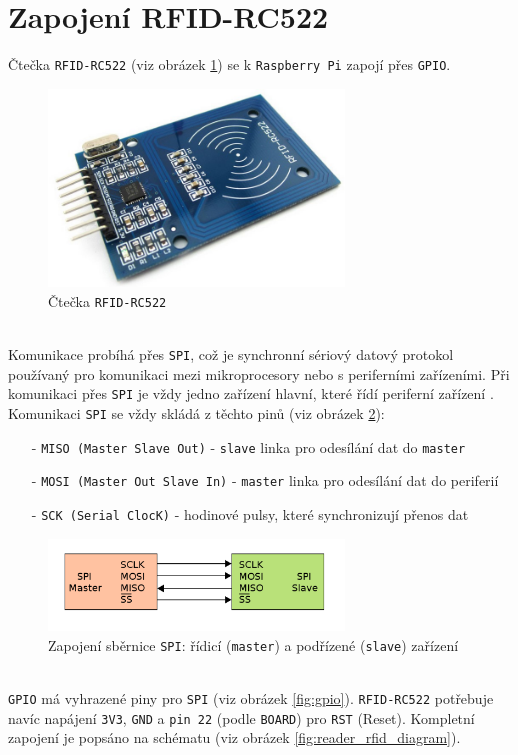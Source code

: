 \documentclass[czech,BP]{thesiskiv}
\begin{document}
		\section{Zapojení RFID-RC522}
Čtečka \texttt{RFID-RC522} (viz obrázek \ref{fig:rfid_rc522}) se k \texttt{Raspberry Pi} zapojí přes \texttt{GPIO}. 
\begin{figure}[H]
		\centering
		\includegraphics[width=0.7\textwidth]{../images/rfid_rc522.jpg}	
		\caption{Čtečka \texttt{RFID-RC522}}
		\label{fig:rfid_rc522}
	\end{figure}
\ \\
Komunikace probíhá přes \texttt{SPI}, což je synchronní sériový datový protokol používaný pro komunikaci mezi mikroprocesory nebo s periferními zařízeními.
Při komunikaci přes \texttt{SPI} je vždy jedno zařízení hlavní, které řídí periferní zařízení \cite{upton2014raspberry}.
Komunikaci \texttt{SPI} se vždy skládá z těchto pinů (viz obrázek \ref{fig:spi}):			
\begin{itemize}[noitemsep]
\item [-] \texttt{MISO (Master Slave Out)} - \texttt{slave} linka pro odesílání dat do \texttt{master}
\item [-] \texttt{MOSI (Master Out Slave In)} - \texttt{master} linka pro odesílání dat do periferií
\item [-] \texttt{SCK (Serial ClocK)} - hodinové pulsy, které synchronizují přenos dat 
\end{itemize}
						
	\begin{figure}[H]
		\centering
		\includegraphics[width=0.7\textwidth]{../images/spi.png}	
		\caption{Zapojení sběrnice \texttt{SPI}: řídicí (\texttt{master}) a podřízené (\texttt{slave}) zařízení}
		\label{fig:spi}
	\end{figure}
\ \\
\texttt{GPIO} má vyhrazené piny pro \texttt{SPI} (viz obrázek \ref{fig:gpio}). \texttt{RFID-RC522} potřebuje navíc napájení \texttt{3V3}, \texttt{GND} a \texttt{pin 22} (podle \texttt{BOARD}) pro \texttt{RST} (Reset). Kompletní zapojení je popsáno na schématu (viz obrázek \ref{fig:reader_rfid_diagram}).
\end{document}
